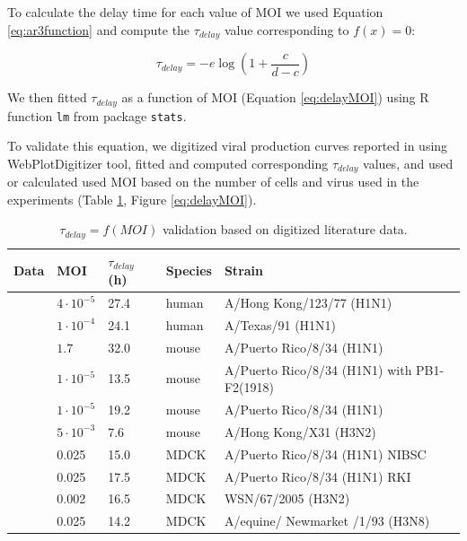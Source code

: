 To calculate the delay time for each value of MOI we used Equation \ref{eq:ar3function} and compute the $\tau_{delay}$ value corresponding to $f(x) = 0$:

\begin{equation}
\tau_{delay} = -e\log(1+\frac{c}{d-c})
\end{equation}

We then fitted $\tau_{delay}$ as a function of MOI (Equation \ref{eq:delayMOI}) using R function \texttt{lm} from package \texttt{stats}.

To validate this equation, we digitized viral production curves reported in \cite{baccam2006kinetics, handel2007neuraminidase, handel2010towards, smith2011effect, miao2010quantifying, mohler2005mathematical} using WebPlotDigitizer \cite{Rohatgi2020} tool, fitted and computed corresponding $\tau_{delay}$ values, and used or calculated used MOI based on the number of cells and virus used in the experiments (Table \ref{table:delayTauValidation}, Figure \ref{eq:delayMOI}).

\begin{table}[h!]
\centering
\caption[$\tau_{delay} = f(MOI)$ validation]{$\tau_{delay} = f(MOI)$ validation based on digitized literature data.}
\label{table:delayTauValidation}

\begin{tabular}{p{2cm} p{2cm} p{2cm} p{2cm} p{4cm}}
\hline 
\textbf{Data} & \textbf{MOI} & \textbf{$\tau_{delay}$ (h)} &  \textbf{Species} & \textbf{Strain}\\
\hline
\cite{baccam2006kinetics} & $4\cdot 10^{-5}$ & 27.4 & human & A/Hong Kong/123/77 (H1N1)\\
\cite{handel2007neuraminidase} & $1\cdot 10^{-4}$ & 24.1 & human & A/Texas/91 (H1N1)\\
\hline
\cite{handel2010towards} & $1.7$ & 32.0 & mouse & A/Puerto Rico/8/34 (H1N1)\\
\cite{smith2011effect} & $1\cdot 10^{-5}$ & 13.5 & mouse & A/Puerto Rico/8/34 (H1N1) with PB1-F2(1918)\\
\cite{smith2011effect} & $1\cdot 10^{-5}$ & 19.2 & mouse & A/Puerto Rico/8/34 (H1N1)\\
\cite{miao2010quantifying} & $5\cdot 10^{-3}$ & 7.6 & mouse & A/Hong  Kong/X31 (H3N2)\\
\hline
\cite{schulze2009infection} & 0.025 & 15.0 & MDCK & A/Puerto Rico/8/34 (H1N1) NIBSC\\
\cite{schulze2009infection} & 0.025 & 17.5 & MDCK & A/Puerto Rico/8/34 (H1N1) RKI\\
\cite{schulze2009infection} & 0.002 & 16.5 & MDCK & WSN/67/2005 (H3N2)\\
\cite{mohler2005mathematical} & 0.025 & 14.2 & MDCK & A/equine/ Newmarket /1/93 (H3N8)\\
\hline
\end{tabular}
\end{table}

